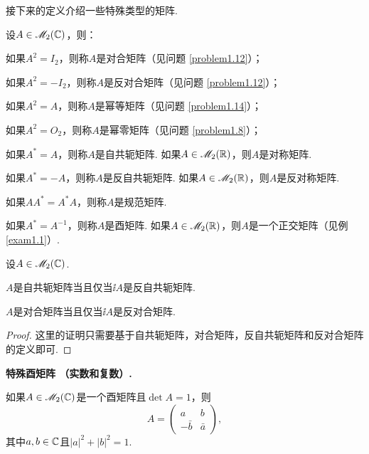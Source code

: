   接下来的定义介绍一些特殊类型的矩阵.
  \begin{definition}
    设$A\in\mathscr M_2(\mathbb C)$，则：
    \begin{enum}
      \item 如果$A^2=I_2$，则称$A$是{\kaishu 对合矩阵}（见问题 \ref{problem1.12}）；
      \item 如果$A^2=-I_2$，则称$A$是{\kaishu 反对合矩阵}（见问题 \ref{problem1.12}）；
      \item 如果$A^2=A$，则称$A$是{\kaishu 幂等矩阵}（见问题 \ref{problem1.14}）；
      \item 如果$A^2=O_2$，则称$A$是{\kaishu 幂零矩阵}（见问题 \ref{problem1.8}）；
      \item 如果$A^\ast=A$，则称$A$是{\kaishu 自共轭矩阵}. 如果$A\in\mathscr M_2(\mathbb R)$，则$A$是对称矩阵.
      \item 如果$A^\ast=-A$，则称$A$是{\kaishu 反自共轭矩阵}. 如果$A\in\mathscr M_2(\mathbb R)$，则$A$是反对称矩阵.
      \item 如果$AA^\ast=A^\ast A$，则称$A$是{\kaishu 规范矩阵}. 
      \item 如果$A^\ast=A^{-1}$，则称$A$是{\kaishu 酉矩阵}. 如果$A\in\mathscr M_2(\mathbb R)$，则$A$是一个正交矩阵（见例 \ref{exam1.1}）.
    \end{enum}
  \end{definition}

  \begin{lemma}
    设$A\in\mathscr M_2(\mathbb C)$.
    \begin{enum}
      \item $A$是自共轭矩阵当且仅当$\ii A$是反自共轭矩阵.
      \item $A$是对合矩阵当且仅当$\ii A$是反对合矩阵.
    \end{enum}
  \end{lemma}

  \begin{proof}
    这里的证明只需要基于自共轭矩阵，对合矩阵，反自共轭矩阵和反对合矩阵的定义即可.
  \end{proof}

  \begin{example}
    {\bfseries 特殊酉矩阵 \mbox{\hyds （}实数和复数\hyds）.}
    \begin{mybox}
      如果$A\in\mathscr M_2(\mathbb C)$是一个酉矩阵且$\det A=1$，则
      \[
        A = \begin{pmatrix}
          a & b \\
          -\bar b & \bar a
        \end{pmatrix},
      \]
      其中$a,b\in\mathbb C$且$|a|^2+|b|^2=1$.
    \end{mybox}
  \end{example}

